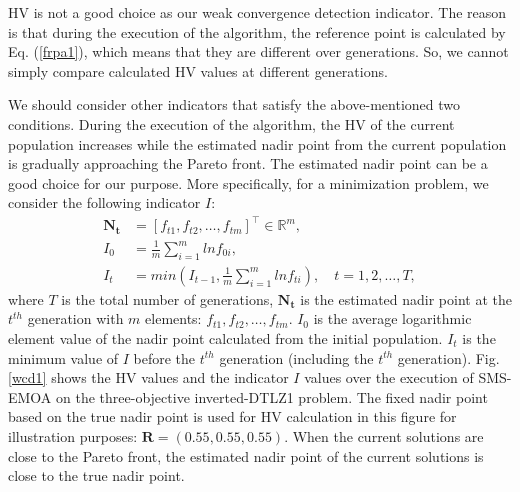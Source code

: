 \documentclass[conference]{IEEEtran}
\begin{document}
HV is not a good choice as our weak convergence detection indicator. 
The reason is that during the execution of the algorithm, the reference point is calculated by Eq. (\ref{frpa1}), 
which means that they are different over generations. 
So, we cannot simply compare calculated HV values at different generations. 

We should consider other indicators that satisfy the above-mentioned two conditions. 
During the execution of the algorithm, the HV of the current population increases 
while the estimated nadir point from the current population is gradually approaching the Pareto front. 
The estimated nadir point can be a good choice for our purpose. 
More specifically,
for a minimization problem, we consider the following indicator $I$:
\begin{equation}\begin{aligned}\label{ewcd1}
  \boldsymbol{N_{t}} &= [f_{t1},f_{t2},\dots,f_{tm}]^\top \in \mathbb{R}^m ,\\
  I_{0} &= \frac{1}{m} \sum_{i=1}^{m}lnf_{0i},\\
  I_{t} &= min(I_{t-1},\frac{1}{m} \sum_{i=1}^{m}lnf_{ti}), \quad
  t = 1,2,\dots,T,
\end{aligned}
\end{equation}
where $T$ is the total number of generations, 
$\boldsymbol{N_{t}}$ is the estimated nadir point at the $t^{th}$ generation with $m$ elements: $f_{t1},f_{t2},\dots,f_{tm}$. 
$I_0$ is the average logarithmic element value of the nadir point calculated from the initial population.
$I_t$ is the minimum value of $I$ before the $t^{th}$ generation (including the $t^{th}$ generation). 
Fig. \ref{wcd1} shows the HV values and the indicator $I$ values over the execution of SMS-EMOA 
on the three-objective inverted-DTLZ1 problem. 
The fixed nadir point based on the true nadir point is used for HV calculation in this figure for illustration purposes: $\boldsymbol R = (0.55, 0.55, 0.55)$.
When the current solutions are close to the Pareto front, the estimated nadir point of the
current solutions is close to the true nadir point. 
\end{document}

